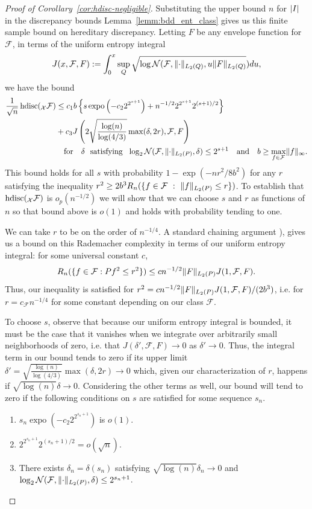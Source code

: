 \documentclass{article}
\DeclarePairedDelimiter\norm{\lVert}{\rVert}
\DeclarePairedDelimiter\abs{\lvert}{\rvert}
\DeclareMathOperator{\expo}{expo}
\theoremstyle{definition}
\newcommand{\calF}{\ensuremath{\mathcal{F}}}
\newcommand{\calN}{\ensuremath{\mathcal{N}}}
\newcommand{\calX}{\ensuremath{\mathcal{X}}}
\newcommand{\qfor}{\quad \text{for} \quad}
\newcommand{\qand}{\quad \text{and} \quad}
\DeclareMathOperator{\hdisc}{hdisc}
\newcommand{\F}{\ensuremath{\mathcal{F}}}
\let\P\relax
\DeclareMathOperator{\P}{P}
\newcommand{\<}{\langle}
\renewcommand{\>}{\rangle}
\begin{document}
\begin{refsection}
\begin{proof}[Proof of Corollary~\ref{cor:hdisc-negligible}]
Substituting the upper bound $n$ for $\abs{I}$ in the discrepancy bounds Lemma~\ref{lemm:bdd_ent_class} gives us this finite sample bound on hereditary discrepancy. Letting $F$ be any envelope function for $\F$, in terms of the uniform entropy integral
$$
J(x,\F,F) := \int_0^{x} \sup_{Q} \sqrt{\log\calN(\F, \norm{\cdot}_{L_2(Q)}, u\norm{F}_{L_2(Q)}}) du,
$$
we have the bound
$$
\begin{aligned}
\frac{1}{\sqrt{n}}\hdisc(\P_{\calX} \F) &\le c_1b\left\{ s \expo\left(-c_2 2^{2^{s+1}}\right) + n^{-1/2} 2^{2^{s+1}} 2^{(s+1)/2} \right\} \\
&+c_3 J\left(2\sqrt{\frac{\log(n)}{\log(4/3)}}\max(\delta,2r), \F, F\right) \\
&\qfor
\delta \ \text{ satisfying }  \ \log_2 \calN(\calF, \norm{\cdot}_{L_2(P)}, \delta) \le 2^{s+1} \qand b \ge \max_{f \in \F}\norm{f}_\infty.
\end{aligned}
$$
This bound holds for all $s$ with probability $1-\exp(-nr^2/8b^2)$ for any $r$ satisfying the inequality $r^2 \ge 2b^3 R_n( \{f \in \F \ : \ \norm{f}_{L_2(P)} \le r \})$. To establish that $\hdisc(\P_{\calX} \F)$ is $o_p(n^{-1/2})$
we will show that we can choose $s$ and $r$ as functions of $n$ so that bound above is $o(1)$ and holds with probability tending to one.

We can take $r$ to be on the order of $n^{-1/4}$. A standard chaining argument \citet[see e.g.][Theorem 2.1.41]{van1996weak}), gives us a bound on this Rademacher complexity in terms of our uniform entropy integral: for some universal constant $c$,
$$
R_n(\{f \in \F : P f^2 \le r^2\}) \le c n^{-1/2} \norm{F}_{L_2(P)} J(1,\F, F).
$$
Thus, our inequality is satisfied for $r^2 = cn^{-1/2} \norm{F}_{L_2(P)} J(1,\F, F) / (2b^3)$, i.e. for $r = c_{\F} n^{-1/4}$ for some constant depending on our class $\F$.

To choose $s$, observe that because our uniform entropy integral is bounded,
it must be the case that it vanishes when we integrate over arbitrarily small neighborhoods of zero, i.e. that $J(\delta', \calF, F) \to 0$ as $\delta' \to 0$. Thus, the integral term in our bound tends to zero if its upper limit $\delta'=\sqrt{\frac{\log(n)}{\log(4/3)}}\max(\delta,2r) \to 0$ which, given our characterization of $r$, happens if $\sqrt{\log(n)}\delta \to 0$. Considering the other terms as well, our bound will tend to zero if the following conditions on $s$ are satisfied for some sequence $s_n$.
\begin{enumerate}
  \item $s_n \expo(-c_2 2^{2^{s_n+1}})$ is $o(1)$.
  \item $2^{2^{s_n+1}} 2^{(s_n+1)/2} = o(\sqrt{n})$.
  \item There exists $\delta_n = \delta(s_n)$ satisfying
  $\sqrt{\log(n)}\delta_n \to 0$ and $\log_2 \calN(\calF, \norm{\cdot}_{L_2(P)}, \delta) \le 2^{s_n+1}$.
\end{enumerate}


\end{proof}
\end{refsection}
\end{document}
